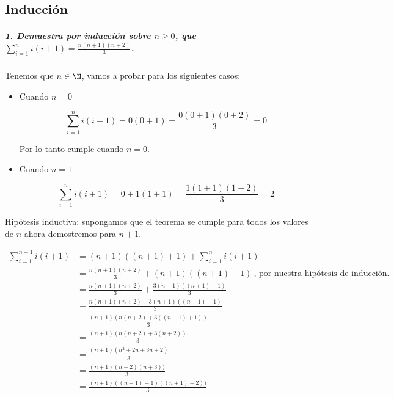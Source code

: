 \documentclass[]{article}
\date{}
\let\oldsubparagraph\subparagraph
\renewcommand{\subparagraph}[1]{\oldsubparagraph{#1}\mbox{}}
\begin{document}
\hypertarget{header-n3}{%
\subsection{Inducción}\label{header-n3}}

\hypertarget{header-n8}{%
\subparagraph{\texorpdfstring{1. Demuestra por inducción sobre
\(n \ge 0\), que
\(\sum_{i=1}^{n}{i(i+1)=\frac{n(n+1)(n+2)}{3}}\).}{1. Demuestra por inducción sobre n \textbackslash{}ge 0, que \textbackslash{}sum\_\{i=1\}\^{}\{n\}\{i(i+1)=\textbackslash{}frac\{n(n+1)(n+2)\}\{3\}\}.}}\label{header-n8}}

Tenemos que \(n \in \N\), vamos a probar para los siguientes casos:

\begin{itemize}
\item
  Cuando \(n = 0\)

  \[\sum_{i=1}^{n}{i(i+1)=0(0+1)= \frac{0(0+1)(0+2)}{3}} = 0\]

  Por lo tanto cumple cuando \(n = 0\).
\end{itemize}

\begin{itemize}
\item
  Cuando \(n = 1\)

  \[\sum_{i=1}^{n}{i(i+1)=0 + 1(1+1)= \frac{1(1+1)(1+2)}{3}} = 2\]
\end{itemize}

Hipótesis inductiva: supongamos que el teorema se cumple para todos los
valores de \(n\) ahora demostremos para \(n+1\).

\begin{equation}
\begin{split}
{\sum_{i=1}^{n+1}{i(i+1)}} & = (n+1)((n+1)+1) + {\sum_{i=1}^{n}{i(i+1)}} \\
& = \frac{n(n+1)(n+2)}{3} + (n+1)((n+1)+1)\ \text {, por nuestra hipótesis de inducción.}\\
& = \frac{n(n+1)(n+2)}{3}+ \frac{3(n+1)((n+1)+1)}{3} \\
& = \frac{n(n+1)(n+2)+3(n+1)((n+1)+1)}{3} \\
& = \frac{(n+1)(n(n+2)+3((n+1) +1))}{3} \\
& = \frac{(n+1)(n(n+2)+3(n+2))}{3} \\
& = \frac{(n+1)(n^2+2n+3n+2)}{3} \\
& = \frac{(n+1)(n+2)(n+3))}{3} \\
& = \frac{(n+1)((n+1)+1)((n+1)+2))}{3} \\
\end{split}
\end{equation}
\end{document}
